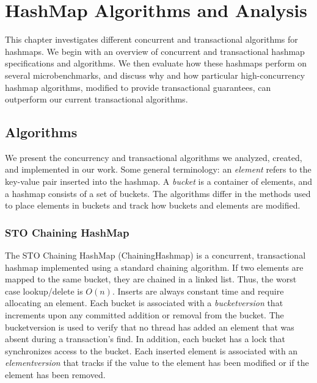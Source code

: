 \chapter{HashMap Algorithms and Analysis}
\label{HashMap}

This chapter investigates different concurrent and transactional algorithms for hashmaps. We begin with an overview of concurrent and transactional hashmap specifications and algorithms. We then evaluate how these hashmaps perform on several microbenchmarks, and discuss why and how particular high-concurrency hashmap algorithms, modified to provide transactional guarantees, can outperform our current transactional algorithms.

\section{Algorithms}

We present the concurrency and transactional algorithms we analyzed, created, and implemented in our work. Some general terminology: an \emph{element} refers to the key-value pair inserted into the hashmap. A \emph{bucket} is a container of elements, and a hashmap consists of a set of buckets. The algorithms differ in the methods used to place elements in buckets and track how buckets and elements are modified.

\subsection{STO Chaining HashMap}
The STO Chaining HashMap (ChainingHashmap) is a concurrent, transactional hashmap implemented using a standard chaining algorithm. If two elements are mapped to the same bucket, they are chained in a linked list. Thus, the worst case lookup/delete is $O(n)$. Inserts are always constant time and require allocating an element. Each bucket is associated with a \emph{bucketversion} that increments upon any committed addition or removal from the bucket. The bucketversion is used to verify that no thread has added an element that was absent during a transaction's find. In addition, each bucket has a lock that synchronizes access to the bucket. Each inserted element is associated with an \emph{elementversion} that tracks if the value to the element has been modified or if the element has been removed.

